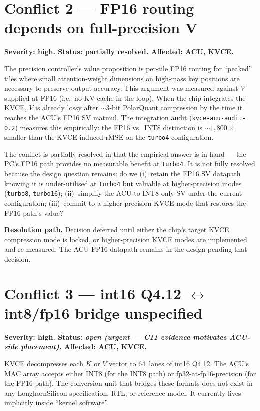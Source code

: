 \documentclass[11pt]{article}
\begin{document}
\section{Conflict 2 --- FP16 routing depends on full-precision V}
\label{sec:c2}

\textbf{Severity: high. Status: partially resolved. Affected: ACU, KVCE.}

The precision controller's value proposition is per-tile FP16 routing
for ``peaked'' tiles where small attention-weight dimensions on
high-mass key positions are necessary to preserve output accuracy.
This argument was measured against $V$ supplied at FP16 (i.e.\ no
KV cache in the loop). When the chip integrates the KVCE, $V$ is
already lossy after $\sim$3-bit PolarQuant compression by the time it
reaches the ACU's FP16 SV matmul. The integration audit
(\texttt{kvce-acu-audit-0.2}) measures this empirically: the FP16
vs.\ INT8 distinction is $\sim 1{,}800\times$ smaller than the
KVCE-induced rMSE on the \texttt{turbo4} configuration.

The conflict is partially resolved in that the empirical answer is
in hand --- the PC's FP16 path provides no measurable benefit at
\texttt{turbo4}. It is not fully resolved because the design question
remains: do we (i)~retain the FP16 SV datapath knowing it is
under-utilised at \texttt{turbo4} but valuable at higher-precision
modes (\texttt{turbo8}, \texttt{turbo16}); (ii)~simplify the ACU to
INT8-only SV under the current configuration; (iii)~commit to a
higher-precision KVCE mode that restores the FP16 path's value?

\textbf{Resolution path.} Decision deferred until either the chip's
target KVCE compression mode is locked, or higher-precision KVCE
modes are implemented and re-measured. The ACU FP16 datapath
remains in the design pending that decision.

\section{Conflict 3 --- int16 Q4.12 $\leftrightarrow$ int8/fp16 bridge unspecified}
\label{sec:c3}

\textbf{Severity: high. Status: \textit{open (urgent --- C11 evidence
motivates ACU-side placement)}. Affected: ACU, KVCE.}

KVCE decompresses each $K$ or $V$ vector to 64~lanes of int16 Q4.12.
The ACU's MAC array accepts either INT8 (for the INT8 path) or
fp32-at-fp16-precision (for the FP16 path). The conversion unit
that bridges these formats does not exist in any LonghornSilicon
specification, RTL, or reference model. It currently lives
implicitly inside ``kernel software''.
\end{document}
